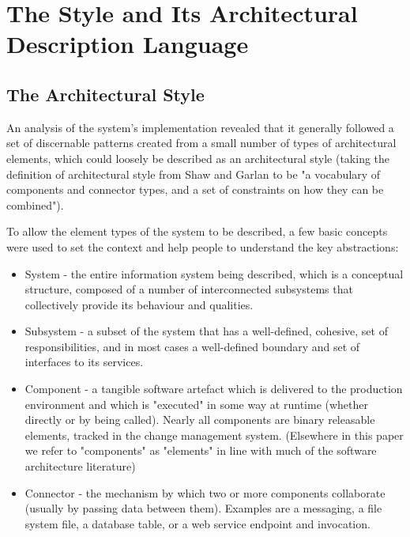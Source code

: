\section{The Style and Its Architectural Description Language}

\subsection{The Architectural Style}

  An analysis of the system's implementation revealed that it generally followed a set of discernable patterns created from a small number of types of architectural elements, which could loosely be described as an architectural style (taking the definition of architectural style from Shaw and Garlan \cite{shaw1996-softwarearch} to be "a vocabulary of components and connector types, and a set of constraints on how they can be combined").  

  To allow the element types of the system to be described, a few basic concepts were used to set the context and help people to understand the key abstractions:

\begin{itemize}
\item System - the entire information system being described, which is a conceptual structure, composed of a number of interconnected subsystems that collectively provide its behaviour and qualities.

\item Subsystem - a subset of the system that has a well-defined, cohesive, set of responsibilities, and in most cases a well-defined boundary and set of interfaces to its services.

\item Component - a tangible software artefact which is delivered to the production environment and which is "executed" in some way at runtime (whether directly or by being called). Nearly all components are binary releasable elements, tracked in the change management system. (Elsewhere in this paper we refer to "components" as "elements" in line with much of the software architecture literature)

\item Connector - the mechanism by which two or more components collaborate (usually by passing data between them).  Examples are a messaging, a file system file, a database table, or a web service endpoint and invocation.

\end{itemize}

